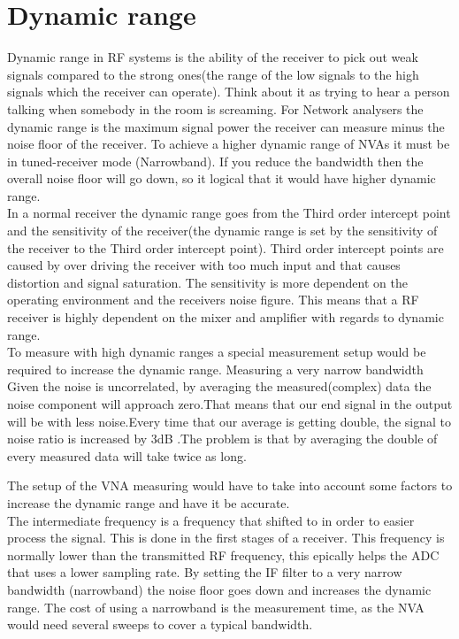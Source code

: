\section{Dynamic range}
Dynamic range in RF systems is the ability of the receiver to pick out weak signals compared to the strong ones(the range of the low signals to the high signals which the receiver can operate). Think about it as trying to hear a person talking when somebody in the room is screaming. For Network analysers the dynamic range is the maximum signal power the receiver can measure minus the noise floor of the receiver. To achieve a higher dynamic range of NVAs it must be  in tuned-receiver mode (Narrowband). If you reduce the bandwidth then the overall noise floor will go down, so it logical that it would have higher dynamic range. \citep{AgilentNVA} \\
In a normal receiver the dynamic range goes from the Third order intercept point and the sensitivity of the receiver(the dynamic range is set by the sensitivity of the receiver to the Third order intercept point). Third order intercept points are caused by over driving the receiver with too much input and that causes distortion and signal saturation. The sensitivity is more dependent on the operating environment and the receivers noise figure. \citep{understandDynamic} This means that a RF receiver is highly dependent on the mixer and amplifier with regards to dynamic range.\\
To measure with high dynamic ranges a special measurement setup would be required to increase the dynamic range.
Measuring a very narrow bandwidth
Given the noise is uncorrelated, by averaging the measured(complex) data the noise component will approach zero.That means that our end signal in the output will be with less noise.Every time that our average is getting double, the signal to noise ratio is increased by 3dB .The problem is that by averaging the double of every measured data will take twice as long.\citep{KeysightAVG}

The setup of the VNA measuring would have to take into account some factors to increase the dynamic range and have it be accurate. \\
The intermediate frequency is a frequency that shifted to in order to easier process the signal. This is done in the first stages of a receiver. This frequency is normally lower than the transmitted RF frequency, this epically helps the ADC that uses a lower sampling rate. 
By setting the IF filter to a very narrow bandwidth (narrowband) the noise floor goes down and increases the dynamic range. The cost of using a narrowband is the measurement time, as the NVA would need several sweeps to cover a typical bandwidth.

